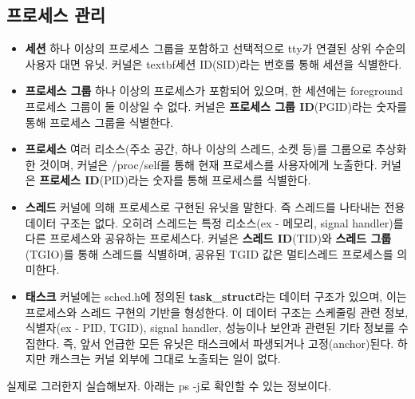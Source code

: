 \subsection{프로세스 관리}
\begin{itemize}
    \item \textbf{세션}\newline
        하나 이상의 프로세스 그룹을 포함하고 선택적으로 tty가 연결된 
        상위 수순의 사용자 대면 유닛.
        커널은 textbf{세션 ID}(SID)라는 번호를 통해 세션을 식별한다.
    \item \textbf{프로세스 그룹}\newline
        하나 이상의 프로세스가 포함되어 있으며, 
        한 세션에는 foreground 프로세스 그룹이 둘 이상일 수 없다.
        커널은 \textbf{프로세스 그룹 ID}(PGID)라는 숫자를 통해 프로세스 그룹을 식별한다.
    \item \textbf{프로세스}\newline
        여러 리소스(주소 공간, 하나 이상의 스레드, 소켓 등)를 그룹으로 추상화한 것이며, 
        커널은 /proc/self를 통해 현재 프로세스를 사용자에게 노출한다.
        커널은 \textbf{프로세스 ID}(PID)라는 숫자를 통해 프로세스를 식별한다.
    \item \textbf{스레드}\newline
        커널에 의해 프로세스로 구현된 유닛을 말한다.
        즉 스레드를 나타내는 전용 데이터 구조는 없다.
        오히려 스레드는 특정 리소스(ex - 메모리, signal handler)를 다른 프로세스와 공유하는 프로세스다.
        커널은 \textbf{스레드 ID}(TID)와 \textbf{스레드 그룹}(TGIO)를 통해 스레드를 식별하며, 
        공유된 TGID 값은 멀티스레드 프로세스를 의미한다.
    \item \textbf{태스크}\newline
        커널에는 sched.h에 정의된 \textbf{task\_struct}라는 데이터 구조가 있으며, 
        이는 프로세스와 스레드 구현의 기반을 형성한다.
        이 데이터 구조는 스케줄링 관련 정보, 식별자(ex - PID, TGID), signal handler, 
        성능이나 보안과 관련된 기타 정보를 수집한다.
        즉, 앞서 언급한 모든 유닛은 태스크에서 파생되거나 고정(anchor)된다. 
        하지만 캐스크는 커널 외부에 그대로 노출되는 일이 없다.
\end{itemize}

\begin{flushleft}
    실제로 그러한지 실습해보자.\newline
    아래는 ps -j로 확인할 수 있는 정보이다.
\end{flushleft}

